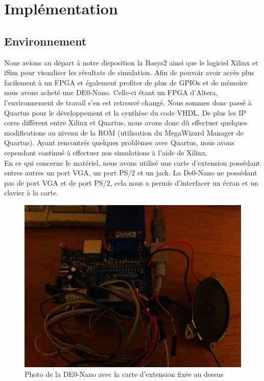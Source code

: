 \section{Implémentation}
\subsection{Environnement}
Nous avions au départ à notre disposition la Basys2 ainsi que le logiciel Xilinx et iSim pour visualiser les résultats de simulation. Afin de pouvoir avoir accès plus facilement à un FPGA et également profiter de plus de GPIOs et de mémoire nous avons acheté une DE0-Nano. Celle-ci étant un FPGA d'Altera, l'environnement de travail s'en est retrouvé changé. Nous sommes donc passé à Quartus pour le développement et la synthèse du code VHDL. De plus les IP cores diffèrent entre Xilinx et Quartus, nous avons donc dû effectuer quelques modifications au niveau de la ROM (utilisation du MegaWizard Manager de Quartus). Ayant rencontrés quelques problèmes avec Quartus, nous avons cependant continué à effectuer nos simulations à l'aide de Xilinx.\\

En ce qui concerne le matériel, nous avons utilisé une carte d'extension \cite{cite:vgaplus256kit} possédant entres autres un port VGA, un port PS/2 et un jack. La De0-Nano ne possédant pas de port VGA et de port PS/2, cela nous a permis d'interfacer un écran et un clavier à la carte.

\begin{figure}[h!]
	\centering
	\includegraphics[scale=0.5]{images/IMG_1017.jpg}
	\caption{Photo de la DE0-Nano avec la carte d'extension fixée au dessus}
	\label{fig:photoDE0}
\end{figure}

